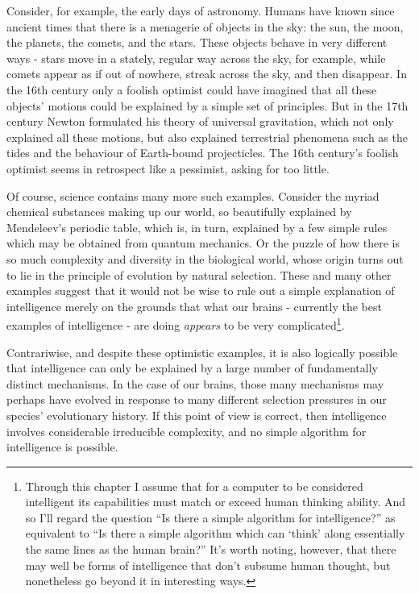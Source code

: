 Consider, for example, the early days of astronomy. Humans have known since ancient times that there is a menagerie of objects in the sky: the sun, the moon, the planets, the comets, and the stars. These objects behave in very different ways - stars move in a stately, regular way across the sky, for example, while comets appear as if out of nowhere, streak across the sky, and then disappear. In the 16th century only a foolish optimist could have imagined that all these objects' motions could be explained by a simple set of principles. But in the 17th century Newton formulated his theory of universal gravitation, which not only explained all these motions, but also explained terrestrial phenomena such as the tides and the behaviour of Earth-bound projecticles. The 16th century's foolish optimist seems in retrospect like a pessimist, asking for too little.

Of course, science contains many more such examples. Consider the myriad chemical substances making up our world, so beautifully explained by Mendeleev's periodic table, which is, in turn, explained by a few simple rules which may be obtained from quantum mechanics. Or the puzzle of how there is so much complexity and diversity in the biological world, whose origin turns out to lie in the principle of evolution by natural selection. These and many other examples suggest that it would not be wise to rule out a simple explanation of intelligence merely on the grounds that what our brains - currently the best examples of intelligence - are doing \textit{appears} to be very complicated\footnote{Through this chapter I assume that for a computer to be considered intelligent its capabilities must match or exceed human thinking ability. And so I'll regard the question ``Is there a simple algorithm for intelligence?'' as equivalent to ``Is there a simple algorithm which can `think' along essentially the same lines as the human brain?'' It's worth noting, however, that there may well be forms of intelligence that don't subsume human thought, but nonetheless go beyond it in interesting ways.}.

Contrariwise, and despite these optimistic examples, it is also logically possible that intelligence can only be explained by a large number of fundamentally distinct mechanisms. In the case of our brains, those many mechanisms may perhaps have evolved in response to many different selection pressures in our species' evolutionary history. If this point of view is correct, then intelligence involves considerable irreducible complexity, and no simple algorithm for intelligence is possible.

